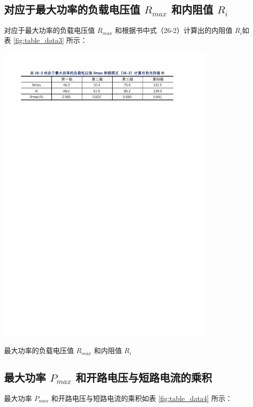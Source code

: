 \documentclass[12pt]{article}
\begin{document}
\subsection{\normalfont 对应于最大功率的负载电压值 $R_{max}$ 和内阻值 $R_i$}

对应于最大功率的负载电压值 $R_{max}$ 和根据书中式（26-2）计算出的内阻值 $R_i$如表 \ref{fig:table_data3} 所示：

\begin{table}[H] %
    \centering
    \includegraphics[width=0.8\textwidth]{./figures/表3.pdf} 
    \caption{最大功率的负载电压值 $R_{max}$ 和内阻值 $R_i$}
    \label{fig:table_data3}
\end{table}

\subsection{\normalfont 最大功率 $P_{max}$ 和开路电压与短路电流的乘积}

最大功率 $P_{max}$ 和开路电压与短路电流的乘积如表 \ref{fig:table_data4} 所示：
\end{document}

